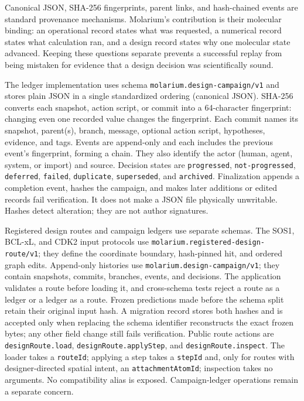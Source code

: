 Canonical JSON, SHA-256 fingerprints, parent links, and hash-chained events are
standard provenance mechanisms. Molarium's contribution is their molecular
binding: an operational record states what was requested, a numerical record
states what calculation ran, and a design record states why one molecular state
advanced. Keeping these questions separate prevents a successful replay from
being mistaken for evidence that a design decision was scientifically sound.

The ledger implementation uses schema \texttt{molarium.design-campaign/v1} and
stores plain JSON in a
single standardized ordering (canonical JSON). SHA-256 converts each snapshot,
action script, or commit into a 64-character fingerprint: changing even one
recorded value changes the fingerprint. Each commit names its snapshot,
parent(s), branch, message, optional action script, hypotheses, evidence, and
tags. Events are append-only and each includes the previous event's fingerprint,
forming a chain. They also identify the actor (human, agent, system, or import)
and source.
Decision states are \texttt{progressed}, \texttt{not-progressed},
\texttt{deferred}, \texttt{failed}, \texttt{duplicate},
\texttt{superseded}, and \texttt{archived}. Finalization appends a completion
event, hashes the campaign, and makes later additions or edited records fail
verification. It does not make a JSON file physically unwritable. Hashes detect
alteration; they are not author signatures.

Registered design routes and campaign ledgers use separate schemas. The SOS1,
BCL-xL, and CDK2 input protocols use
\texttt{molarium.registered-\allowbreak design-\allowbreak route/v1}; they define the coordinate
boundary, hash-pinned hit, and ordered graph edits. Append-only histories use
\texttt{molarium.design-\allowbreak campaign/v1}; they contain snapshots, commits,
branches, events, and decisions. The application validates a route before
loading it, and cross-schema tests reject a route as a ledger or a ledger as a
route.
Frozen predictions made before the schema split retain their original input
hash. A migration record stores both hashes and is accepted only when replacing
the schema identifier reconstructs the exact frozen bytes; any other field
change still fails verification. Public route actions are
\texttt{designRoute.load}, \texttt{designRoute.applyStep}, and
\texttt{designRoute.inspect}. The loader takes a \texttt{routeId}; applying a
step takes a \texttt{stepId} and, only for routes with designer-directed spatial
intent, an \texttt{attachmentAtomId}; inspection takes no arguments. No
compatibility alias is exposed. Campaign-ledger operations remain a separate
concern.


